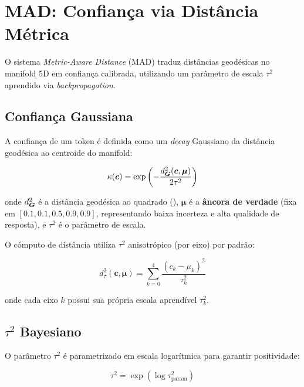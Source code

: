 
\section{MAD: Confian\c{c}a via Dist\^ancia M\'etrica}
\label{sec:mad}

O sistema \textit{Metric-Aware Distance} (MAD) traduz dist\^ancias geod\'esicas
no manifold 5D em confian\c{c}a calibrada, utilizando um par\^ametro de escala
$\tau^2$ aprendido via \textit{backpropagation}.

\subsection{Confian\c{c}a Gaussiana}

A confian\c{c}a de um token \'e definida como um \textit{decay} Gaussiano da
dist\^ancia geod\'esica ao centroide do manifold:

\begin{equation}
    \kappa(\bm{c}) = \exp\left(-\frac{d_{\bm{G}}^2(\bm{c}, \bm{\mu})}{2\tau^2}\right)
    \label{eq:mad_conf}
\end{equation}

onde $d_{\bm{G}}^2$ \'e a dist\^ancia geod\'esica ao quadrado (),
$\bm{\mu}$ \'e a \textbf{\^ancora de verdade} (fixa em
$[0.1, 0.1, 0.5, 0.9, 0.9]$, representando baixa incerteza e alta
qualidade de resposta), e $\tau^2$ \'e o par\^ametro de escala.

O c\'omputo de dist\^ancia utiliza $\tau^2$ anisotr\'opico (por eixo)
por padr\~ao:

\begin{equation}
    d_{\tau}^2(\bm{c}, \bm{\mu}) = \sum_{k=0}^{4} \frac{(c_k - \mu_k)^2}{\tau^2_k}
\end{equation}

onde cada eixo $k$ possui sua pr\'opria escala aprend\'ivel $\tau^2_k$.

\subsection{$\tau^2$ Bayesiano}

O par\^ametro $\tau^2$ \'e parametrizado em escala logar\'itmica para
garantir positividade:

\begin{equation}
    \tau^2 = \exp(\log \tau^2_{\text{param}})
\end{equation}

